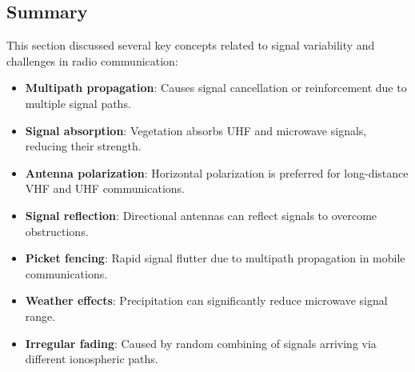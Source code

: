 \subsection*{Summary}
This section discussed several key concepts related to signal variability and challenges in radio communication:
\begin{itemize}
    \item \textbf{Multipath propagation}: Causes signal cancellation or reinforcement due to multiple signal paths.
    \item \textbf{Signal absorption}: Vegetation absorbs UHF and microwave signals, reducing their strength.
    \item \textbf{Antenna polarization}: Horizontal polarization is preferred for long-distance VHF and UHF communications.
    \item \textbf{Signal reflection}: Directional antennas can reflect signals to overcome obstructions.
    \item \textbf{Picket fencing}: Rapid signal flutter due to multipath propagation in mobile communications.
    \item \textbf{Weather effects}: Precipitation can significantly reduce microwave signal range.
    \item \textbf{Irregular fading}: Caused by random combining of signals arriving via different ionospheric paths.
\end{itemize}
